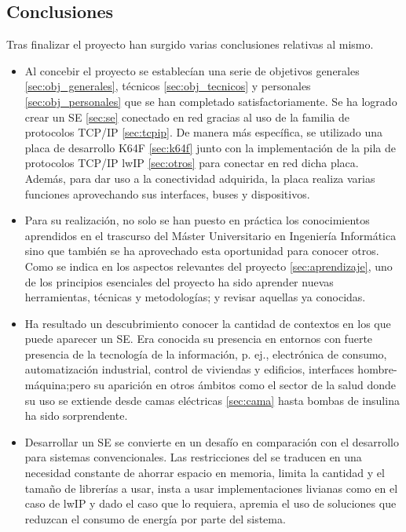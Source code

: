 {\label{ch:conclusiones-lineas}}

\subsection{Conclusiones}{\label{sec:conclusiones}}
Tras finalizar el proyecto han surgido varias conclusiones relativas al mismo.

\begin{itemize}
  \item Al concebir el proyecto se establecían una serie de objetivos generales
  \ref{sec:obj_generales}, técnicos \ref{sec:obj_tecnicos} y personales
  \ref{sec:obj_personales} que se han completado satisfactoriamente.
  Se ha logrado crear un SE \ref{sec:se} conectado en red gracias al uso de
  la familia de protocolos TCP/IP \ref{sec:tcpip}. De manera más específica,
  se utilizado una placa de desarrollo K64F \ref{sec:k64f} junto con la
  implementación de la pila de protocolos TCP/IP lwIP \ref{sec:otros} para
  conectar en red dicha placa. Además, para dar uso a la conectividad adquirida,
  la placa realiza varias funciones aprovechando sus interfaces, buses y
  dispositivos.
  
  \item Para su realización, no solo se han puesto en práctica los conocimientos
  aprendidos en el trascurso del Máster Universitario en Ingeniería Informática
  sino que también se ha aprovechado esta oportunidad para conocer otros. Como
  se indica en los aspectos relevantes del proyecto \ref{sec:aprendizaje}, uno 
  de los principios esenciales del proyecto ha sido aprender nuevas
  herramientas, técnicas y metodologías; y revisar aquellas ya conocidas.

  \item Ha resultado un descubrimiento conocer la cantidad de contextos en los
  que puede aparecer un SE. Era conocida su presencia en entornos con fuerte
  presencia de la tecnología de la información, p. ej., electrónica de consumo,
  automatización industrial, control de viviendas y edificios, interfaces
  hombre-máquina;pero su aparición en otros ámbitos como el sector de la salud
  donde su uso se extiende desde camas eléctricas \ref{sec:cama} hasta bombas
  de insulina ha sido sorprendente.

  \item Desarrollar un SE se convierte en un desafío en comparación con el
  desarrollo para sistemas convencionales. Las restricciones del 
   se traducen en una necesidad constante de ahorrar
  espacio en memoria, limita la cantidad y el tamaño de librerías a usar,
  insta a usar implementaciones livianas como en el caso de lwIP y dado el
  caso que lo requiera, apremia el uso de soluciones que reduzcan el consumo
  de energía por parte del sistema.


\end{itemize}
